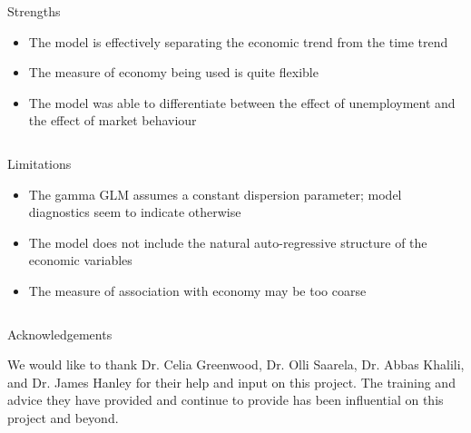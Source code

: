 \documentclass[final]{beamer}
\newcounter{acolumn}%
\def\autoheight{\vspace*{0pt}}%
\begin{document}
\begin{frame}
\begin{acolumns}[t]
\begin{column}{.24\linewidth}
        \end{column}
        
        \begin{column}{.24\linewidth}
		
         
         \begin{block}{Strengths}
         	\begin{itemize}
         		\item The model is effectively separating the economic trend from the time trend
         		\item The measure of economy being used is quite flexible
         		\item The model was able to differentiate between the effect of unemployment and the effect of market behaviour
         	\end{itemize}
          \autoheight   
         \end{block}
                      
        \end{column}
                  
        
        \begin{column}{.24\linewidth}
         
         \begin{block}{Limitations}
         	\begin{itemize}
         		\item The gamma GLM assumes a constant dispersion parameter; model diagnostics seem to indicate otherwise
         		\item The model does not include the natural auto-regressive structure of the economic variables
         		\item The measure of association with economy may be too coarse
         	\end{itemize}
          \autoheight   
         \end{block}
                      
        \end{column}
        
        
         \begin{column}{.24\linewidth}
                 
          \begin{block}{Acknowledgements}
             \begin{center}
             We would like to thank Dr. Celia Greenwood, Dr. Olli Saarela, Dr. Abbas Khalili, and Dr. James Hanley for their help and input on this project. The training and advice they have provided and continue to provide has been influential on this project and beyond.
             \end{center}
             
           \autoheight   
          \end{block}
                              
         \end{column}
        
        
        \end{acolumns}
    
    \vfill 
  \end{frame}
\end{document}
